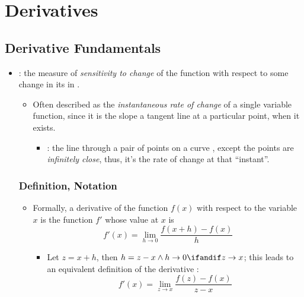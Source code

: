 \chapter{Derivatives}

\section{Derivative Fundamentals}
\begin{itemize}
  \item {}: the measure of \emph{sensitivity to change} of the function  with respect to some change in its in .
    \begin{itemize}
      \item Often described as the \emph{instantaneous rate of change} of a single variable function, since it is the slope a tangent line at a particular point, when it exists. 
        \begin{itemize}
          \item {}: the line through a pair of points on a curve , except the points are \emph{infinitely close}, thus, it's the rate of change at that ``instant''.
        \end{itemize}
    \end{itemize} 

  \subsection{Definition, Notation}
  \begin{itemize}
    \item Formally, a derivative of the function \(f(x)\) with respect to the variable \(x\) is the function \(f'\) whose value at \(x\) is 
    \[%
      f'(x) = \lim_{h \to 0} \frac{f(x+h)-f(x)}{h}
    \]%
    \begin{itemize}
      \item Let \(z = x + h\), then \(h = z-x \land h \to 0 \ifandif z\to x\); this leads to an equivalent definition of the derivative :
      \[%
        f'(x) = \lim_{z \to x} \frac{f(z)-f(x)}{z-x}
      \]%
    \end{itemize}
    

\end{itemize}
\end{itemize}
